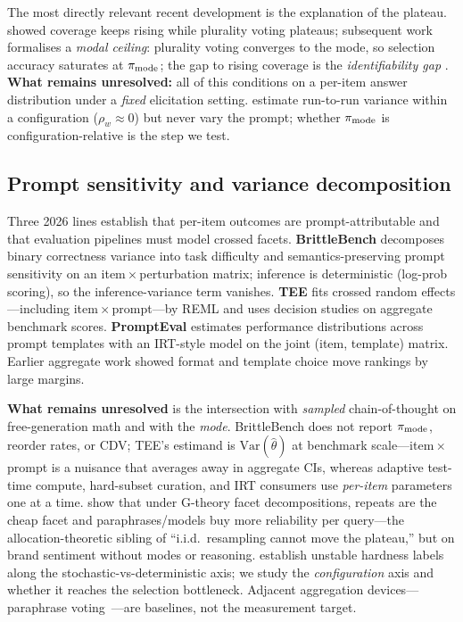 The most directly relevant recent development is the explanation of the
plateau. \citet{brown2024monkeys} showed coverage keeps rising while plurality
voting plateaus; subsequent work formalises a \emph{modal ceiling}:
plurality voting converges to the mode, so selection accuracy saturates at
$\pi_{\mathrm{mode}}$; the gap to rising coverage is the \emph{identifiability gap}
\citep{blendasc2025,certifiedsc2025,samplecomplexity2025}.
\textbf{What remains unresolved:}
all of this conditions on a per-item answer distribution under a \emph{fixed}
elicitation setting. \citet{bay2026modal} estimate run-to-run variance within a
configuration ($\rho_w \approx 0$) but never vary the prompt; whether $\pi_{\mathrm{mode}}$
is configuration-relative is the step we test.

\subsection{Prompt sensitivity and variance decomposition}
\label{sec:related-prompt}

Three 2026 lines establish that per-item outcomes are prompt-attributable and
that evaluation pipelines must model crossed facets. \textbf{BrittleBench}
\citep{brittlebench2026} decomposes binary correctness variance into task
difficulty and semantics-preserving prompt sensitivity on an item\,$\times$\,perturbation
matrix; inference is deterministic (log-prob scoring), so the inference-variance
term vanishes. \textbf{TEE} \citep{tee2026} fits crossed random effects---including
item\,$\times$\,prompt---by REML and uses decision studies on aggregate benchmark
scores. \textbf{PromptEval} \citep{prompteval2024} estimates performance
distributions across prompt templates with an IRT-style model on the joint
(item, template) matrix. Earlier aggregate work
\citep{sclar2024formatspread,mizrahi2024multiprompt,alzahrani2024leaderboard}
showed format and template choice move rankings by large margins.

\textbf{What remains unresolved} is the intersection with \emph{sampled}
chain-of-thought on free-generation math and with the \emph{mode}. BrittleBench
does not report $\pi_{\mathrm{mode}}$, reorder rates, or CDV; TEE's estimand is
$\mathrm{Var}(\hat\theta)$ at benchmark scale---item\,$\times$\,prompt is a
nuisance that averages away in aggregate CIs, whereas adaptive test-time compute,
hard-subset curation, and IRT consumers use \emph{per-item} parameters one at a
time. \citet{facetnoise2026,cyclicjudge2026} show that under G-theory facet decompositions,
repeats are the cheap facet and paraphrases/models buy more reliability per
query---the allocation-theoretic sibling of ``i.i.d.\ resampling cannot move the
plateau,'' but on brand sentiment without modes or reasoning. \citet{hardunreached2026}
establish unstable hardness labels along the stochastic-vs-deterministic axis;
we study the \emph{configuration} axis and whether it reaches the selection
bottleneck. Adjacent aggregation devices---paraphrase
voting~\citep{paraconsistency2024,zhou2024paraphrase}---are baselines, not the
measurement target.

